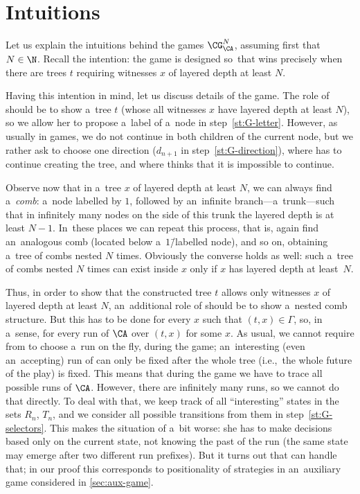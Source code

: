 \documentclass{lmcs}
\numberwithin{equation}{section}
\numberwithin{figure}{section}
\begin{document}
\section{Intuitions}
\label{sec:intuitions}

Let us explain the intuitions behind the games $\CG^N_\CA$, assuming first that $N\in\N$.
Recall the intention: the game is designed so~that \eve wins precisely when there are trees $t$ requiring witnesses $x$ of layered depth at least $N$.

Having this intention in mind, let us discuss details of the game.
The role of \eve should be to show a~tree $t$ (whose all witnesses $x$ have layered depth at least $N$), so we allow her to propose a~label of a~node in step~\ref{st:G-letter}.
However, as usually in games, we do not continue in both children of the current node, but we rather ask \adam to choose one direction ($d_{n+1}$ in step~\ref{st:G-direction}),
where \eve has to continue creating the tree, and where \adam thinks that it is impossible to continue.

Observe now that in a~tree $x$ of layered depth at least $N$, we can always find a~\emph{comb}:
a~node labelled by $1$, followed by an~infinite branch---a~trunk---such that in infinitely many nodes on the side of this trunk the layered depth is at least $N{-}1$.
In~these places we can repeat this process, that is, again find an~analogous comb (located below a~$1$\=/labelled node), and so on, obtaining a~tree of combs nested $N$ times.
Obviously the converse holds as well: such a~tree of combs nested $N$ times can exist inside $x$ only if $x$ has layered depth at least~$N$.

Thus, in order to show that the constructed tree $t$ allows only witnesses $x$ of layered depth at least $N$, an~additional role of \eve should be to show a~nested comb structure.
But this has to be done for every $x$ such that $(t,x)\in\Gamma$, so, in a~sense, for every run of $\CA$ over $(t,x)$ for some $x$.
As usual, we cannot require from \adam to choose a~run on the fly, during the game;
an~interesting (even an~accepting) run of \CA can only be fixed after the whole tree (i.e.,~the whole future of the play) is fixed.
This means that during the game we have to trace all possible runs of $\CA$.
However, there are infinitely many runs, so we cannot do that directly.
To deal with that, we keep track of all ``interesting'' states in the sets $R_n$, $T_n$,
and we consider all possible transitions from them in step~\ref{st:G-selectors}.
This makes the situation of \eve a~bit worse: she has to make decisions based only on the current state, not knowing the past of the run
(the same state may emerge after two different run prefixes).
But it turns out that \eve can handle that; in our proof this corresponds to positionality of strategies in an~auxiliary game considered in \cref{sec:aux-game}.
\end{document}
